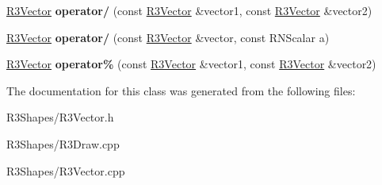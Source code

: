 \begin{DoxyCompactItemize}
\item 
\hyperlink{class_r3_vector}{R3\+Vector} {\bfseries operator/} (const \hyperlink{class_r3_vector}{R3\+Vector} \&vector1, const \hyperlink{class_r3_vector}{R3\+Vector} \&vector2)\hypertarget{class_r3_vector_a2a83692532365a8fbc0712f49c173e1b}{}\label{class_r3_vector_a2a83692532365a8fbc0712f49c173e1b}

\item 
\hyperlink{class_r3_vector}{R3\+Vector} {\bfseries operator/} (const \hyperlink{class_r3_vector}{R3\+Vector} \&vector, const R\+N\+Scalar a)\hypertarget{class_r3_vector_a6fccf68a546a63b413047c6b7409dbf0}{}\label{class_r3_vector_a6fccf68a546a63b413047c6b7409dbf0}

\item 
\hyperlink{class_r3_vector}{R3\+Vector} {\bfseries operator\%} (const \hyperlink{class_r3_vector}{R3\+Vector} \&vector1, const \hyperlink{class_r3_vector}{R3\+Vector} \&vector2)\hypertarget{class_r3_vector_abfb3d272871d7c4dcd5cafdee8803b98}{}\label{class_r3_vector_abfb3d272871d7c4dcd5cafdee8803b98}

\end{DoxyCompactItemize}


The documentation for this class was generated from the following files\+:\begin{DoxyCompactItemize}
\item 
R3\+Shapes/R3\+Vector.\+h\item 
R3\+Shapes/R3\+Draw.\+cpp\item 
R3\+Shapes/R3\+Vector.\+cpp\end{DoxyCompactItemize}
